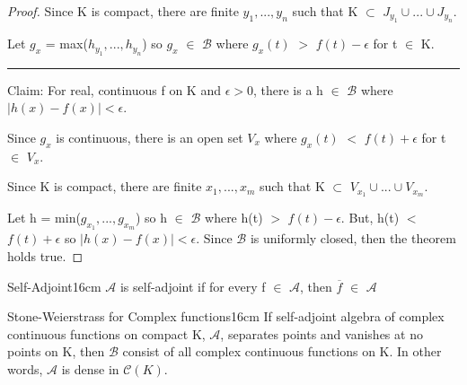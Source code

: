 \begin{proof}
        Since K is compact, there are finite $y_1,...,y_n$ such that
        K $\subset$ $J_{y_1} \cup ... \cup J_{y_n}$.

        Let $g_x$ = max($h_{y_1},...,h_{y_n}$) so $g_x$ $\in$ $\mathscr{B}$
        where $g_x(t)$ $>$ $f(t) - \epsilon$ for t $\in$ K.

        \rule[0.1cm]{15.3cm}{0.01cm}

        Claim: For real, continuous f on K and  $\epsilon > 0$, there is
        a h $\in$ $\mathscr{B}$ where $|h(x) - f(x)| < \epsilon$.

        Since $g_x$ is continuous, there is an open set $V_x$ where
        $g_x(t)$ $<$ $f(t) + \epsilon$ for t $\in$ $V_x$.

        Since K is compact, there are finite $x_1,...,x_m$ such that
        K $\subset$ $V_{x_1} \cup ... \cup V_{x_m}$.

        Let h = min($g_{x_1},...,g_{x_m}$) so h $\in$ $\mathscr{B}$
        where h(t) $>$ $f(t) - \epsilon$.
        But, h(t) $<$ $f(t) + \epsilon$ so
        $|h(x) - f(x)| < \epsilon$.
        Since $\mathscr{B}$ is uniformly closed, then the theorem holds true.
    \end{proof}

    \newpage



    \begin{definition}{Self-Adjoint}{16cm}
        $\mathscr{A}$ is {\color{lblue} self-adjoint} if
        for every f $\in$ $\mathscr{A}$, then $\overline{f}$ $\in$ $\mathscr{A}$
    \end{definition}

    \vspace{0.5cm}



    \begin{wtheorem}{Stone-Weierstrass for Complex functions}{16cm}
        If self-adjoint algebra of complex continuous functions on compact K,
        $\mathscr{A}$, separates points and vanishes at no points on K, then
        $\mathscr{B}$ consist of all complex continuous functions on K.
        In other words, $\mathscr{A}$ is dense in $\mathscr{C}(K)$.
    \end{wtheorem}

